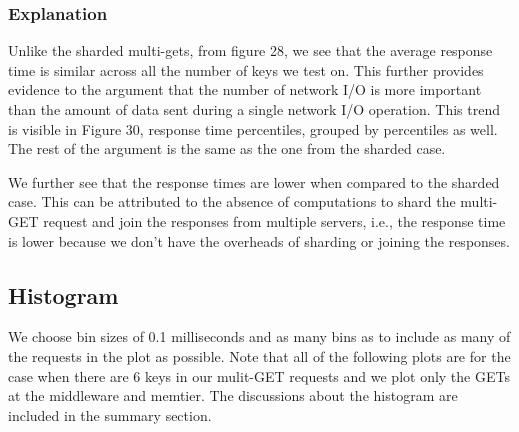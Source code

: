 \documentclass[11pt,a4paper]{article}
\newcommand\instructions[1]{\textcolor{blue}{Instructions: #1}}
\begin{document}
\subsubsection{Explanation}

Unlike the sharded multi-gets, from figure 28, we see that the average response time is similar across all the number of keys we test on. This further provides evidence to the argument that the number of network I/O is more important than the amount of data sent during a single network I/O operation. This trend is visible in Figure 30, response time percentiles, grouped by percentiles as well. 
The rest of the argument is the same as the one from the sharded case.

We further see that the response times are lower when compared to the sharded case. This can be attributed to the absence of computations to shard the multi-GET request and join the responses from multiple servers, i.e., the response time is lower because we don't have the overheads of sharding or joining the responses.


\subsection{Histogram}

We choose bin sizes of 0.1 milliseconds and as many bins as to include as many of the requests in the plot as possible. Note that all of the following plots are for the case when there are 6 keys in our mulit-GET requests and we plot only the GETs at the middleware and memtier. The discussions about the histogram are included in the summary section.
\end{document}
